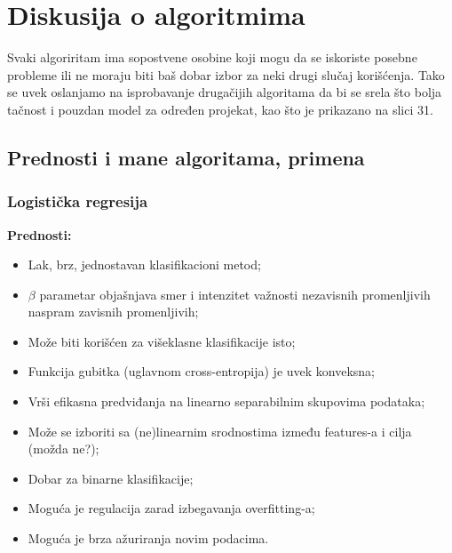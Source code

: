 \documentclass[fontsize=12bp, paper=a4]{scrarticle}
\begin{document}
\newpage


\section{Diskusija o algoritmima}
Svaki algoriritam ima sopostvene osobine koji mogu da se iskoriste posebne probleme ili ne moraju biti baš dobar izbor za neki drugi slučaj korišćenja. Tako se uvek oslanjamo na isprobavanje drugačijih algoritama da bi se srela što bolja tačnost i pouzdan model za određen projekat, kao što je prikazano na slici 31.\cite{comparison}

\vbox{}

\subsection{Prednosti i mane algoritama, primena\cite{comp1a}\cite{comp1b}\cite{comp2}\cite{comp3}\cite{comp4}}
\subsubsection{Logistička regresija}

\textbf{Prednosti:}
\begin{itemize}
    \item Lak, brz, jednostavan klasifikacioni metod;
    \item $\beta$ parametar objašnjava smer i intenzitet važnosti nezavisnih promenljivih naspram zavisnih promenljivih;
    \item Može biti korišćen za višeklasne klasifikacije isto;
    \item Funkcija gubitka (uglavnom cross-entropija) je uvek konveksna;
    \item Vrši efikasna predviđanja na linearno separabilnim skupovima podataka;
    \item Može se izboriti sa (ne)linearnim srodnostima između features-a i cilja (možda ne?);
    \item Dobar za binarne klasifikacije;
    \item Moguća je regulacija zarad izbegavanja overfitting-a;
    \item Moguća je brza ažuriranja novim podacima.
\end{itemize}
\end{document}
